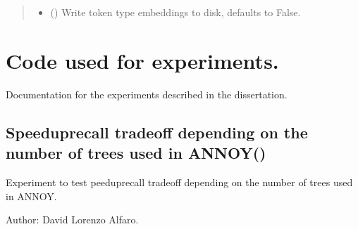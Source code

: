 \documentclass[letterpaper,10pt,english]{sphinxmanual}
\begin{document}
\begin{fulllineitems}
\begin{quote}
\begin{description}
\begin{itemize}
\item {} 
 (\sphinxstyleliteralemphasis{\sphinxupquote{, }}) \textendash{} Write token type embeddings to disk,
defaults to False.

\end{itemize}

\end{description}\end{quote}

\end{fulllineitems}



\chapter{Code used for experiments.}
\label{\detokenize{code:code-used-for-experiments}}
Documentation for the experiments described in the dissertation.


\section{Speedup\sphinxhyphen{}recall tradeoff depending on the number of trees used in ANNOY()}
\label{\detokenize{code:module-experiment_annoy_ntrees}}\label{\detokenize{code:speedup-recall-tradeoff-depending-on-the-number-of-trees-used-in-annoy-experiment-annoy-ntrees-py}}
Experiment to test peedup\sphinxhyphen{}recall tradeoff depending on the number of trees 
used in ANNOY.

Author: David Lorenzo Alfaro.
\end{document}
